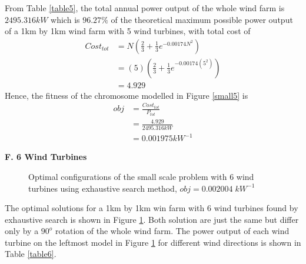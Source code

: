         From Table \ref{table5}, the total annual power output of the whole wind farm is $2495.316kW$ which is $96.27\%$ of the theoretical maximum possible power output of a 1km by 1km wind farm with 5 wind turbines, with total cost of
        \begin{align*}
            Cost_{tot}
            &= N\left(\frac{2}{3} + \frac{1}{3}e^{-0.00174N^2}\right) \\
            &= \left(5\right)\left(\frac{2}{3} + \frac{1}{3}e^{-0.00174\left(5^2\right)}\right) \\
            &= 4.929
        \end{align*}
        Hence, the fitness of the chromosome modelled in Figure \ref{small5} is
        \begin{align*}
            obj
            &=\frac{Cost_{tot}}{P_{tot}} \\
            &=\frac{4.929}{2495.316kW} \\
            &=0.001975kW^{-1}
        \end{align*}
        
    \textbf{F. 6 Wind Turbines}
        \begin{figure}[H]
            \centering
            \qquad
            \caption{Optimal configurations of the small scale problem with 6 wind turbines using exhaustive search method, $obj=0.002004\;kW^{-1}$}
            \label{small6}
        \end{figure}
        
        The optimal solutions for a 1km by 1km win farm with 6 wind turbines found by exhaustive search is shown in Figure \ref{small6}. Both solution are just the same but differ only by a $90^o$ rotation of the whole wind farm. The power output of each wind turbine on the leftmost model in Figure \ref{small6} for different wind directions is shown in Table \ref{table6}.
        
